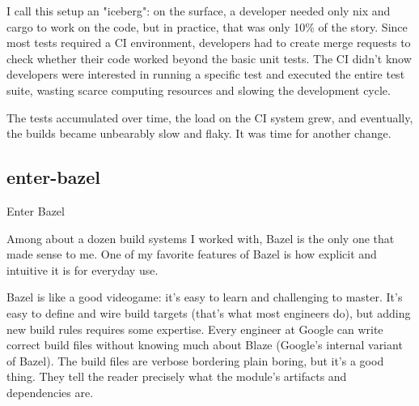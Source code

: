 \documentclass{article}
\begin{document}
I call this setup an "iceberg": on the surface, a developer needed only nix and cargo to work on the code, but in practice, that was only 10\% of the story.
Since most tests required a CI environment, developers had to create merge requests to check whether their code worked beyond the basic unit tests.
The CI didn't know developers were interested in running a specific test and executed the entire test suite, wasting scarce computing resources and slowing the development cycle.

The tests accumulated over time, the load on the CI system grew, and eventually, the builds became unbearably slow and flaky.
It was time for another change.

\subsection{enter-bazel}{Enter Bazel}

Among about a dozen build systems I worked with, Bazel is the only one that made sense to me.
One of my favorite features of Bazel is how explicit and intuitive it is for everyday use.

Bazel is like a good videogame: it's easy to learn and challenging to master.
It's easy to define and wire build targets (that's what most engineers do), but adding new build rules requires some expertise.
Every engineer at Google can write correct build files without knowing much about Blaze (Google's internal variant of Bazel).
The build files are verbose bordering plain boring, but it's a good thing.
They tell the reader precisely what the module's artifacts and dependencies are.
\end{document}

